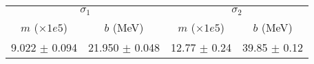 \begin{tabular}{cc|cc}
\multicolumn{2}{c|}{$\sigma_1$} & \multicolumn{2}{|c}{$\sigma_2$} \\
$m$ ($\times1e5$) & $b$ (MeV) & $m$ ($\times1e5$) & $b$ (MeV) \\
\hline
9.022 $\pm$ 0.094 & 21.950 $\pm$ 0.048 & 12.77 $\pm$ 0.24 & 39.85 $\pm$ 0.12\\
\end{tabular}
